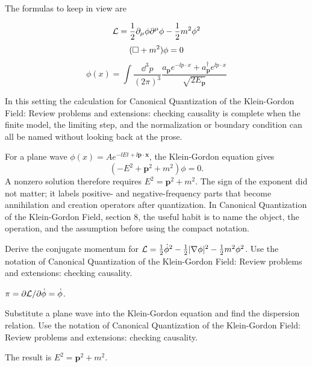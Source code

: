 The formulas to keep in view are

\[
  \mathcal L=\frac12\partial_\mu\phi\partial^\mu\phi-\frac12m^2\phi^2
\]
\[
  (\Box+m^2)\phi=0
\]
\[
  \phi(x)=\int\frac{\dd^3p}{(2\pi)^3}\frac{a_{\bm p}e^{-\ii p\cdot x}+a_{\bm p}^\dagger e^{\ii p\cdot x}}{\sqrt{2E_{\bm p}}}
\]

In this setting the calculation for Canonical Quantization of the Klein-Gordon Field: Review problems and extensions: checking causality is complete when the finite model, the limiting step, and the normalization or boundary condition can all be named without looking back at the prose.




\begin{example}
For a plane wave \(\phi(x)=Ae^{-\ii Et+\ii\bm p\cdot\bm x}\), the Klein-Gordon equation gives
\[
  (-E^2+\bm p^2+m^2)\phi=0.
\]
A nonzero solution therefore requires \(E^2=\bm p^2+m^2\).  The sign of the exponent did not matter; it labels positive- and negative-frequency parts that become annihilation and creation operators after quantization.  In Canonical Quantization of the Klein-Gordon Field, section 8, the useful habit is to name the object, the operation, and the assumption before using the compact notation.
\end{example}



\begin{exercise}
Derive the conjugate momentum for \(\mathcal L=\frac12\dot\phi^2-\frac12|\nabla\phi|^2-\frac12m^2\phi^2\).  Use the notation of Canonical Quantization of the Klein-Gordon Field: Review problems and extensions: checking causality.
\begin{answer}
\(\pi=\partial\mathcal L/\partial\dot\phi=\dot\phi\).
\end{answer}
\end{exercise}

\begin{exercise}
Substitute a plane wave into the Klein-Gordon equation and find the dispersion relation.  Use the notation of Canonical Quantization of the Klein-Gordon Field: Review problems and extensions: checking causality.
\begin{answer}
The result is \(E^2=\bm p^2+m^2\).
\end{answer}
\end{exercise}



